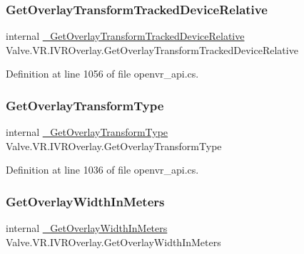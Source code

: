 \subsubsection{\texorpdfstring{GetOverlayTransformTrackedDeviceRelative}{GetOverlayTransformTrackedDeviceRelative}}
{\footnotesize\ttfamily internal \mbox{\hyperlink{struct_valve_1_1_v_r_1_1_i_v_r_overlay_aab0d31c4d5c91a030e4625b2f355f126}{\+\_\+\+Get\+Overlay\+Transform\+Tracked\+Device\+Relative}} Valve.\+V\+R.\+I\+V\+R\+Overlay.\+Get\+Overlay\+Transform\+Tracked\+Device\+Relative}



Definition at line 1056 of file openvr\+\_\+api.\+cs.

\mbox{\label{struct_valve_1_1_v_r_1_1_i_v_r_overlay_a311246a2943dd78801744e97cc91b572}} 
\subsubsection{\texorpdfstring{GetOverlayTransformType}{GetOverlayTransformType}}
{\footnotesize\ttfamily internal \mbox{\hyperlink{struct_valve_1_1_v_r_1_1_i_v_r_overlay_a99fe5b9dbb9381067659cb1c5e5a1cd9}{\+\_\+\+Get\+Overlay\+Transform\+Type}} Valve.\+V\+R.\+I\+V\+R\+Overlay.\+Get\+Overlay\+Transform\+Type}



Definition at line 1036 of file openvr\+\_\+api.\+cs.

\mbox{\label{struct_valve_1_1_v_r_1_1_i_v_r_overlay_a77f6dbab37773036db4f0b8d9e502734}} 
\subsubsection{\texorpdfstring{GetOverlayWidthInMeters}{GetOverlayWidthInMeters}}
{\footnotesize\ttfamily internal \mbox{\hyperlink{struct_valve_1_1_v_r_1_1_i_v_r_overlay_a428a94d317b358800d0bb78217345815}{\+\_\+\+Get\+Overlay\+Width\+In\+Meters}} Valve.\+V\+R.\+I\+V\+R\+Overlay.\+Get\+Overlay\+Width\+In\+Meters}



